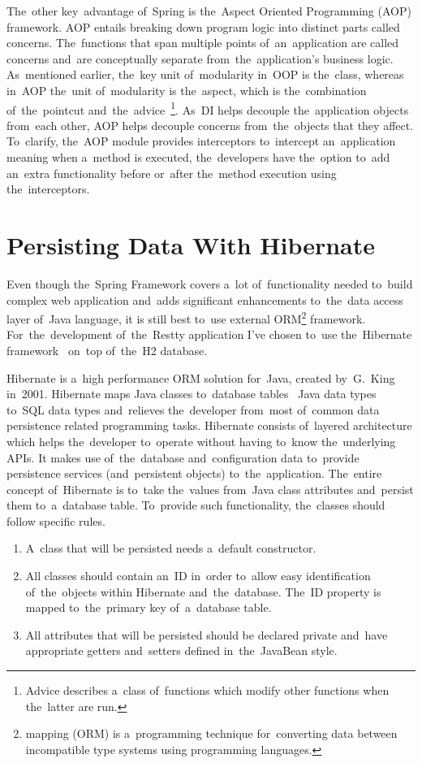 The~other key~advantage of~Spring is the~Aspect Oriented Programming (AOP)
framework. AOP entails breaking down program logic into distinct parts called
concerns. The~functions that span multiple points of~an~application are called
 concerns and~are conceptually separate from~the~application's
business logic. As~mentioned earlier, the~key unit of~modularity in~OOP is
the~class, whereas in~AOP the~unit of~modularity is the~aspect, which is
the~combination of~the~pointcut and~the~advice~\footnote{Advice describes
a~class of~functions which modify other functions when the~latter are run.}.
As~DI helps decouple the~application objects from~each other, AOP helps decouple
 concerns from~the~objects that they affect. To~clarify,
the~AOP module provides interceptors to~intercept an~application meaning when
a~method is executed, the~developers have the~option to~add an~extra
functionality before or~after the~method execution using the~interceptors.



\section{Persisting Data With Hibernate}
Even though the~Spring Framework covers a~lot of~functionality needed to~build
complex web application and~adds significant enhancements to~the~data access
layer of~Java language, it is still best to~use external
ORM\footnote{ mapping (ORM) is a~programming technique
for~converting data between incompatible type systems using
 programming languages.} framework. For~the~development
of~the~Restty application I've chosen to~use the~Hibernate
framework~\cite{Hibernate} on~top of~the~H2 database.

Hibernate is a~high performance ORM solution for~Java, created by~G.~King
in~2001. Hibernate maps Java classes to~database tables ~Java data types to~SQL
data types and~relieves the~developer from~most of~common data persistence
related programming tasks. Hibernate consists of~layered architecture which
helps the~developer to~operate without having to~know the~underlying APIs. It
makes use of~the~database and~configuration data to~provide persistence services
(and~persistent objects) to~the~application. The~entire concept of~Hibernate is
to~take the~values from~Java class attributes and~persist them to~a~database
table. To~provide such functionality, the~classes should follow specific rules.

\begin{enumerate}
  \item A~class that will be persisted needs a~default constructor.
  \item All classes should contain an~ID in~order to~allow easy identification
  of~the~objects within Hibernate and~the~database. The~ID property is mapped
  to~the~primary key of~a~database table.
  \item All attributes that will be persisted should be declared private
  and~have appropriate getters and~setters defined in~the~JavaBean style.
\end{enumerate}

